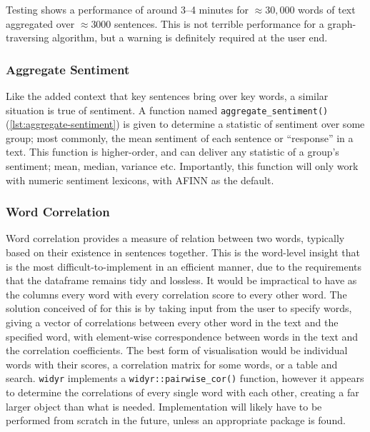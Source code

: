 \documentclass[11pt, a4paper, titlepage]{report}
\begin{document}
Testing shows a performance of around 3--4 minutes for
\(\approx 30,000\) words of text aggregated over \(\approx 3000\)
sentences. This is not terrible performance for a graph-traversing
algorithm, but a warning is definitely required at the user end.

\subsubsection{Aggregate Sentiment}\label{sec:aggregate-sentiment}

Like the added context that key sentences bring over key words, a
similar situation is true of sentiment. A function named
\texttt{aggregate_sentiment()}
(\underline{\cref{lst:aggregate-sentiment}}) is given to determine a
statistic of sentiment over some group; most commonly, the mean
sentiment of each sentence or ``response'' in a text. This function is
higher-order, and can deliver any statistic of a group's sentiment;
mean, median, variance etc. Importantly, this function will only work
with numeric sentiment lexicons, with AFINN as the default.

\subsubsection{Word Correlation}\label{sec:word-correlation}

Word correlation provides a measure of relation between two words,
typically based on their existence in sentences together. This is the
word-level insight that is the most difficult-to-implement in an
efficient manner, due to the requirements that the dataframe remains
tidy and lossless. It would be impractical to have as the columns
every word with every correlation score to every other word. The
solution conceived of for this is by taking input from the user to
specify words, giving a vector of correlations between every other
word in the text and the specified word, with element-wise
correspondence between words in the text and the correlation
coefficients. The best form of visualisation would be individual words
with their scores, a correlation matrix for some words, or a table and
search. \texttt{widyr} implements a
\texttt{widyr::pairwise_cor()} function, however it appears to
determine the correlations of every single word with each other,
creating a far larger object than what is
needed\autocite{robinson19:widyr}. Implementation will likely have to
be performed from scratch in the future, unless an appropriate package
is found.
\end{document}
